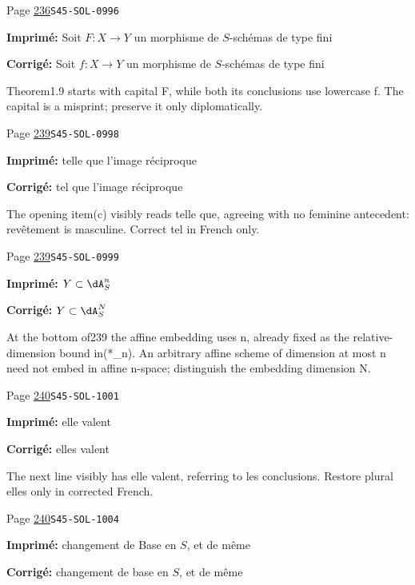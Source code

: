 \begin{description}
\smallskip
\item[\hypertarget{apparatus:FR-0249}{249}] Page \hyperlink{printpage:fr:236}{236}\quad\texttt{S45-SOL-0996}
\par\noindent\textbf{Imprimé:} Soit $F:X\to Y$ un morphisme de $S$-schémas de type fini
\par\noindent\textbf{Corrigé:} Soit $f:X\to Y$ un morphisme de $S$-schémas de type fini
\par\noindent Theorem1.9 starts with capital F, while both its conclusions use lowercase f. The capital is a misprint; preserve it only diplomatically.
\smallskip
\item[\hypertarget{apparatus:FR-0250}{250}] Page \hyperlink{printpage:fr:239}{239}\quad\texttt{S45-SOL-0998}
\par\noindent\textbf{Imprimé:} telle 
    que l'image réciproque
\par\noindent\textbf{Corrigé:} tel 
    que l'image réciproque
\par\noindent The opening item(c) visibly reads telle que, agreeing with no feminine antecedent: revêtement is masculine. Correct tel in French only.
\smallskip
\item[\hypertarget{apparatus:FR-0251}{251}] Page \hyperlink{printpage:fr:239}{239}\quad\texttt{S45-SOL-0999}
\par\noindent\textbf{Imprimé:} \(Y\subset \dA_S^n\)
\par\noindent\textbf{Corrigé:} \(Y\subset \dA_S^N\)
\par\noindent At the bottom of239 the affine embedding uses n, already fixed as the relative-dimension bound in(*\_n). An arbitrary affine scheme of dimension at most n need not embed in affine n-space; distinguish the embedding dimension N.
\smallskip
\item[\hypertarget{apparatus:FR-0252}{252}] Page \hyperlink{printpage:fr:240}{240}\quad\texttt{S45-SOL-1001}
\par\noindent\textbf{Imprimé:} elle valent
\par\noindent\textbf{Corrigé:} elles valent
\par\noindent The next line visibly has elle valent, referring to les conclusions. Restore plural elles only in corrected French.
\smallskip
\item[\hypertarget{apparatus:FR-0253}{253}] Page \hyperlink{printpage:fr:240}{240}\quad\texttt{S45-SOL-1004}
\par\noindent\textbf{Imprimé:} changement de Base en $S$, et de même
\par\noindent\textbf{Corrigé:} changement de base en $S$, et de même

\end{description}
